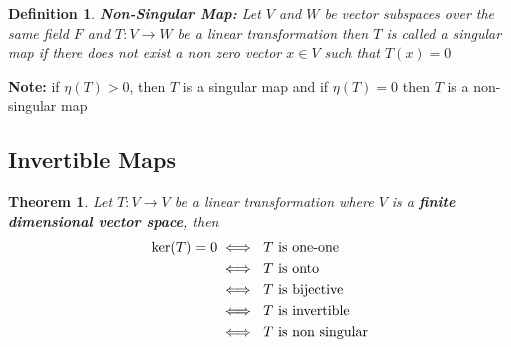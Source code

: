 \documentclass[a4paper, titlepage]{article}
\newtheorem{theorem}{Theorem}[section]
\newtheorem{definition}{Definition}[section]
\begin{document}
        \begin{definition}
            \textbf{Non-Singular Map: }Let $V$ and $W$ be vector subspaces
            over the same field $F$ and $T: V \to W$ be a linear 
            transformation then $T$ is called a singular map if there
            does not exist a non zero vector $x \in V$ such that 
            $T(x) = 0$
        \end{definition}
        \noindent\textbf{Note: }if $\eta(T) > 0$, then $T$ is a singular map
        and if $\eta(T) = 0$ then $T$ is a non-singular map
    \subsection{Invertible Maps}
        \begin{theorem}
            Let $T: V \rightarrow V$ be a linear transformation where $V$
            is a \textbf{finite dimensional vector space}, then
            \begin{align*}
                \textup{ker($T$)} = 0 & \iff \textup{ $T$ is one-one} \\
                                      & \iff \textup{ $T$ is onto} \\
                                      & \iff \textup{ $T$ is bijective} \\
                                      & \iff \textup{ $T$ is invertible} \\
                                      & \iff \textup{ $T$ is non singular}
            \end{align*}
        \end{theorem}
        \setlength{\fboxsep}{1em}
\end{document}
